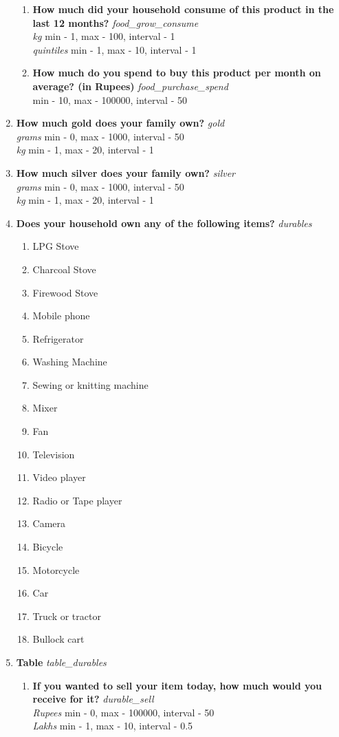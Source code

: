 \documentclass{article}
\begin{document}
\begin{enumerate}
\begin{enumerate}[label*=\arabic*.]
\item {\bfseries How much did your household consume of this product in the last 12 months?}\emph{ food\_grow\_consume } 
\\ \emph{ kg }min - 1, max - 100, interval - 1 
\\ \emph{ quintiles }min - 1, max - 10, interval - 1 
 
\item {\bfseries How much do you spend to buy this product per month on average? (in Rupees)}\emph{ food\_purchase\_spend } 
\\min - 10, max - 100000, interval - 50 
 
\end{enumerate} 
\item {\bfseries How much gold does your family own?}\emph{ gold } 
\\ \emph{ grams }min - 0, max - 1000, interval - 50 
\\ \emph{ kg }min - 1, max - 20, interval - 1 
 
\item {\bfseries How much silver does your family own?}\emph{ silver } 
\\ \emph{ grams }min - 0, max - 1000, interval - 50 
\\ \emph{ kg }min - 1, max - 20, interval - 1 
 
\item {\bfseries Does your household own any of the following items?}\emph{ durables } 
\begin{enumerate} 
\item LPG Stove 
\item Charcoal Stove 
\item  Firewood Stove 
\item Mobile phone 
\item Refrigerator 
\item Washing Machine 
\item Sewing or knitting machine 
\item Mixer 
\item Fan 
\item Television 
\item Video player 
\item Radio or Tape player 
\item Camera 
\item Bicycle 
\item Motorcycle 
\item Car 
\item Truck or tractor 
\item Bullock cart 
\end{enumerate} 
\item {\bfseries Table}\emph{ table\_durables } 
\begin{enumerate}[label*=\arabic*.] 
\item {\bfseries If you wanted to sell your item today, how much would you receive for it?}\emph{ durable\_sell } 
\\ \emph{ Rupees }min - 0, max - 100000, interval - 50 
\\ \emph{ Lakhs }min - 1, max - 10, interval - 0.5 
 

\end{enumerate}
\end{enumerate}
\end{document}
